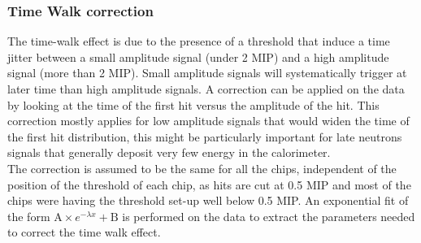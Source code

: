 \documentclass[twoside,a4paper,11pt]{article}
\begin{document}
\subsubsection{Time Walk correction}
\label{subsec:timewalk}

The time-walk effect is due to the presence of a threshold that induce a time jitter between a small amplitude signal (under 2 MIP) and a high amplitude signal (more than 2 MIP). Small amplitude signals will systematically trigger at later time than high amplitude signals. %
A correction can be applied on the data by looking at the time of the first hit versus the amplitude of the hit. This correction mostly applies for low amplitude signals that would widen the time of the first hit distribution, this might be particularly important for late neutrons signals that generally deposit very few energy in the calorimeter.\\
The correction is assumed to be the same for all the chips, independent of the position of the threshold of each chip, as hits are cut at 0.5 MIP and most of the chips were having the threshold set-up well below 0.5 MIP. An exponential fit of the form $\text{A} \times e^{-\lambda{}x} + \text{B}$ is performed on the data to extract the parameters needed to correct the time walk effect.
\end{document}
